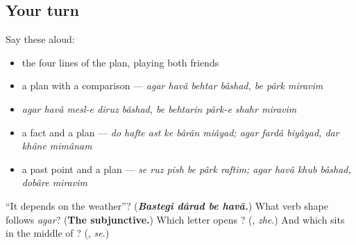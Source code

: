 \subsection*{Your turn}
Say these aloud:

\begin{itemize}
\raggedright
  \item the four lines of the plan, playing both friends
  \item a plan with a comparison — \emph{agar havâ behtar bâshad, be pârk miravim}
  \item \emph{agar havâ mesl-e diruz bâshad, be behtarin pârk-e shahr miravim}
  \item a fact and a plan — \emph{do hafte ast ke bârân miâyad; agar fardâ biyâyad, dar khâne mimânam}
  \item a past point and a plan — \emph{se ruz pish be pârk raftim; agar havâ khub bâshad, dobâre miravim}
\end{itemize}

\begin{tcolorbox}[breakable,colback=teal!4,colframe=teal!35!black,title={Before you move on}]
\textquotedblleft{}It depends on the weather\textquotedblright{}? (\emph{\textbf{Bastegi dârad be havâ.}}) What verb shape follows \emph{agar}? (\textbf{The subjunctive.}) Which letter opens \textbf{}? (\textbf{}, \emph{zhe}.) And which sits in the middle of \textbf{}? (\textbf{}, \emph{se}.)
\end{tcolorbox}
